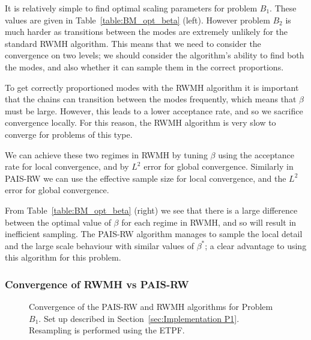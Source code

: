 \documentclass[final]{siamltex}
\begin{document}
It is relatively simple to find optimal scaling parameters for problem $B_1$.
These values are given in Table~\ref{table:BM_opt_beta} (left). However
problem $B_2$ is much harder as transitions between the modes are extremely
unlikely for the standard RWMH algorithm. This means that we need to consider the
convergence on two levels; we should consider the algorithm's ability
to find both the modes, and also whether it can sample them in the correct proportions.

To get correctly proportioned modes with the RWMH algorithm it is
important that the chains can transition between the modes frequently, which
means that $\beta$ must be large. However, this leads to a lower
acceptance rate, and so we sacrifice convergence locally. For this reason, the RWMH algorithm is very slow to
converge for problems of this type.

We can achieve these two regimes in RWMH by tuning $\beta$ using the acceptance rate for local convergence, and by $L^2$ error for global convergence. Similarly in PAIS-RW we can use the effective sample size for local convergence, and the $L^2$ error for global convergence.

From Table~\ref{table:BM_opt_beta} (right) we see that there is a large difference between the optimal value of $\beta$ for each regime in RWMH, and so will result in inefficient sampling. The PAIS-RW algorithm manages to sample the local detail and the large scale behaviour with similar values of $\beta^*$; a clear advantage to using this algorithm for this problem.

\subsubsection{Convergence of RWMH vs PAIS-RW}


\begin{figure}[htb]
\centering
{}
\caption{Convergence of the PAIS-RW and RWMH algorithms for Problem $B_1$. Set up described in Section~\ref{sec:Implementation P1}. Resampling is performed using the ETPF.}
\label{fig:BM1_L2}
\end{figure}
\end{document}
